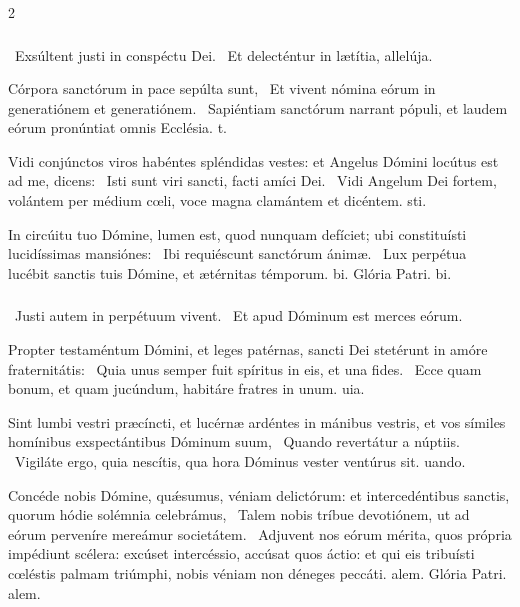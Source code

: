 \documentclass[9pt,twoside]{extarticle}
\begin{document}
\begin{multicols}{2}
\subsubsection*{}
\begin{tightlist}{}
\item {}~Exsúltent justi in conspéctu Dei. ~Et delecténtur in lætítia, allelúja.
\item {} Córpora sanctórum in pace sepúlta sunt, \textred{*}~Et vivent nómina eórum in generatiónem et generatiónem.
~Sapiéntiam sanctórum narrant pópuli, et laudem eórum pronúntiat omnis Ecclésia. t.
\item {} Vidi conjúnctos viros habéntes spléndidas vestes: et Angelus Dómini locútus est ad me, dicens: \textred{*}~Isti sunt viri sancti, facti amíci Dei.
~Vidi Angelum Dei fortem, volántem per médium cœli, voce magna clamántem et dicéntem. sti.
\item {} In circúitu tuo Dómine, lumen est, quod nunquam defíciet; ubi constituísti lucidíssimas mansiónes: \textred{*}~Ibi requiéscunt sanctórum ánimæ.
~Lux perpétua lucébit sanctis tuis Dómine, et ætérnitas témporum. bi. Glória Patri. bi.
\end{tightlist}

\subsubsection*{}
\begin{tightlist}{}
\item {}~Justi autem in perpétuum vivent. ~Et apud Dóminum est merces eórum.
\item {} Propter testaméntum Dómini, et leges patérnas, sancti Dei stetérunt in amóre fraternitátis: \textred{*}~Quia unus semper fuit spíritus in eis, et una fides.
~Ecce quam bonum, et quam jucúndum, habitáre fratres in unum. uia.
\item {} Sint lumbi vestri præcíncti, et lucérnæ ardéntes in mánibus vestris, et vos símiles homínibus exspectántibus Dóminum suum, \textred{*}~Quando revertátur a núptiis.
~Vigiláte ergo, quia nescítis, qua hora Dóminus vester ventúrus sit. uando.
\item {} Concéde nobis Dómine, quǽsumus, véniam delictórum: et intercedéntibus sanctis, quorum hódie solémnia celebrámus, \textred{*}~Talem nobis tríbue devotiónem, ut ad eórum perveníre mereámur societátem.
~Adjuvent nos eórum mérita, quos própria impédiunt scélera: excúset intercéssio, accúsat quos áctio: et qui eis tribuísti cœléstis palmam triúmphi, nobis véniam non déneges peccáti. alem. Glória Patri. alem.
\end{tightlist}


\end{multicols}
\end{document}
